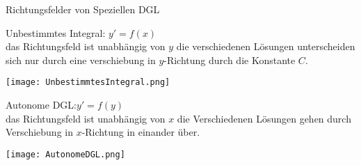 \begin{definition}{Richtungsfelder von Speziellen DGL}\\
  \begin{minipage}{0.58\linewidth}
    Unbestimmtes Integral: \(y'=f(x)\)\\ das Richtungsfeld ist unabhängig von \(y\) die verschiedenen Lösungen
      unterscheiden sich nur durch eine verschiebung in \(y\)-Richtung durch die Konstante \(C\).
  \end{minipage}
  \begin{minipage}{0.4\linewidth}
    \begin{center}
      \texttt{[image: UnbestimmtesIntegral.png]}
      \end{center}
  \end{minipage}
  \begin{minipage}{0.58\linewidth}
    Autonome DGL:\(y'=f(y)\)\\ das Richtungsfeld ist unabhängig von \(x\) die Verschiedenen Lösungen gehen durch
    Verschiebung in \(x\)-Richtung in einander über.
  \end{minipage}
  \begin{minipage}{0.4\linewidth}
    \begin{center}
      \texttt{[image: AutonomeDGL.png]}
      \end{center}
  \end{minipage}
\end{definition}






